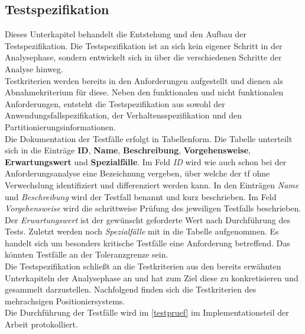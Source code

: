 \documentclass[../../../Bachelorarbeit.tex]{subfiles}
\begin{document}
\subsection{Testspezifikation} \label{testspez}
Dieses Unterkapitel behandelt die Entstehung und den Aufbau der Testspezifikation. Die Testspezifikation ist an sich kein eigener Schritt in der Analysephase, sondern entwickelt sich in über die verschiedenen Schritte der Analyse hinweg.\\
Testkriterien werden bereits in den Anforderungen aufgestellt und dienen als Abnahmekriterium für diese. Neben den funktionalen und nicht funktionalen Anforderungen, entsteht die Testspezifikation aus sowohl der Anwendungsfallspezifikation, der Verhaltensspezifikation und den Partitionierungsinformationen.\\
Die Dokumentation der Testfälle erfolgt in Tabellenform. Die Tabelle unterteilt sich in die Einträge \textbf{ID}, \textbf{Name}, \textbf{Beschreibung}, \textbf{Vorgehensweise}, \textbf{Erwartungswert} und \textbf{Spezialfälle}. Im Feld \textit{ID} wird wie auch schon bei der Anforderungsanalyse eine Bezeichnung vergeben, über welche der \ac{tf} ohne Verwechslung identifiziert und differenziert werden kann. In den Einträgen \textit{Name} und \textit{Beschreibung} wird der Testfall benannt und kurz beschrieben. Im Feld \textit{Vorgehensweise} wird die schrittweise Prüfung des jeweiligen Testfalls beschrieben. Der \textit{Erwartungswert} ist der gewünscht \bzw geforderte Wert nach Durchführung des Tests. Zuletzt werden noch \textit{Spezialfälle} mit in die Tabelle aufgenommen. Es handelt sich um besonders kritische Testfälle eine Anforderung betreffend. Das könnten \zB Testfälle an der Toleranzgrenze sein.\\
Die Testspezifikation schließt an die Testkriterien aus den bereits erwähnten Unterkapiteln der Analysephase an und hat zum Ziel diese zu konkretisieren und gesammelt darzustellen. Nachfolgend finden sich die Testkriterien des mehrachsigen Positioniersystems.\\ %
Die Durchführung der Testfälle wird im \autoref{testpruef} im Implementationsteil der Arbeit protokolliert.
\clearpage
\end{document}
